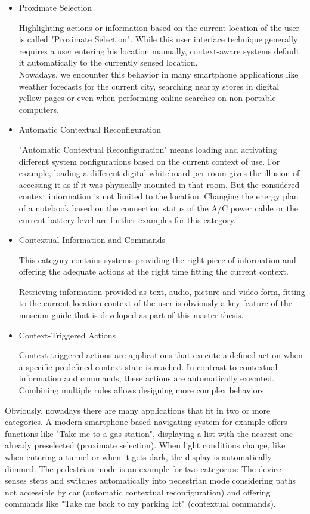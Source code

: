\begin{itemize}
\item Proximate Selection

Highlighting actions or information based on the current location of the user is called "Proximate Selection". While this user interface technique generally requires a user entering his location manually, context-aware systems default it automatically to the currently sensed location. \\
Nowadays, we encounter this behavior in many smartphone applications like weather forecasts for the current city, searching nearby stores in digital yellow-pages or even when performing online searches on non-portable computers.

\item Automatic Contextual Reconfiguration

"Automatic Contextual Reconfiguration" means loading and activating different system configurations based on the current context of use. For example, loading a different digital whiteboard per room gives the illusion of accessing it as if it was physically mounted in that room. But the considered context information is not limited to the location. Changing the energy plan of a notebook based on the connection status of the A/C power cable or the current battery level are further examples for this category. 

\item Contextual Information and Commands

This category contains systems providing the right piece of information and offering the adequate actions at the right time fitting the current context.

Retrieving information provided as text, audio, picture and video form, fitting to the current location context of the user is obviously a key feature of the museum guide that is developed as part of this master thesis.

\item Context-Triggered Actions

Context-triggered actions are applications that execute a defined action when a specific predefined context-state is reached. In contrast to contextual information and commands, these actions are automatically executed. Combining multiple rules allows designing more complex behaviors.

\end{itemize}

Obviously, nowadays there are many applications that fit in two or more categories. A modern smartphone based navigating system for example offers functions like "Take me to a gas station", displaying a list with the nearest one already preselected (proximate selection). When light conditions change, like when entering a tunnel or when it gets dark, the display is automatically dimmed. The pedestrian mode is an example for two categories: The device senses steps and switches automatically into pedestrian mode considering paths not accessible by car (automatic contextual reconfiguration) and offering commands like "Take me back to my parking lot" (contextual commands).



